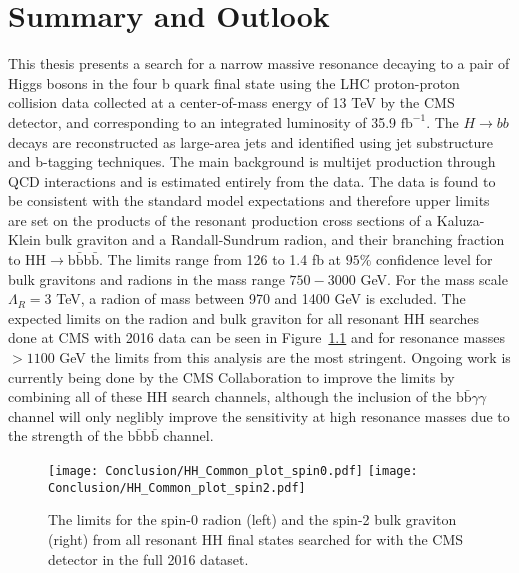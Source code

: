 \chapter{Summary and Outlook}
\label{ch:Summary}

This thesis presents a search for a narrow massive resonance decaying to a pair of Higgs bosons in the four b quark final state using the LHC proton-proton collision data collected at a center-of-mass energy of 13 TeV by the CMS detector, and corresponding to an integrated luminosity of 35.9 $\mathrm{fb}^{-1}$. The $H\rightarrow bb$ decays are reconstructed as large-area jets and identified using jet substructure and b-tagging techniques. The main background is multijet production through QCD interactions and is estimated entirely from the data. The data is found to be consistent with the standard model expectations and therefore upper limits are set on the products of the resonant production cross sections of a Kaluza-Klein bulk graviton and a Randall-Sundrum radion, and their branching fraction to $\mathrm{HH}\rightarrow \mathrm{b\bar{b}b\bar{b}}$. The limits range from 126 to 1.4 fb at $95\%$ confidence level for bulk gravitons and radions in the mass range $750-3000$ GeV. For the mass scale $\Lambda_{R} = 3$ TeV, a radion of mass between 970 and 1400 GeV is excluded. The expected limits on the radion and bulk graviton for all resonant HH searches done at CMS with 2016 data can be seen in Figure~\ref{fig:HHresults} and for resonance masses $> 1100$ GeV the limits from this analysis are the most stringent. Ongoing work is currently being done by the CMS Collaboration to improve the limits by combining all of these HH search channels, although the inclusion of the $\mathrm{b\bar{b}}\gamma\gamma$ channel will only neglibly improve the sensitivity at high resonance masses due to the strength of the $\mathrm{b\bar{b}b\bar{b}}$ channel.

\begin{figure}[h!]
\centering
\texttt{[image: Conclusion/HH\_Common\_plot\_spin0.pdf]}
\texttt{[image: Conclusion/HH\_Common\_plot\_spin2.pdf]}
\caption{The limits for the spin-0 radion (left) and the spin-2 bulk graviton (right) from all resonant HH final states searched for with the CMS detector in the full 2016 dataset.}
\label{fig:HHresults}
\end{figure}

